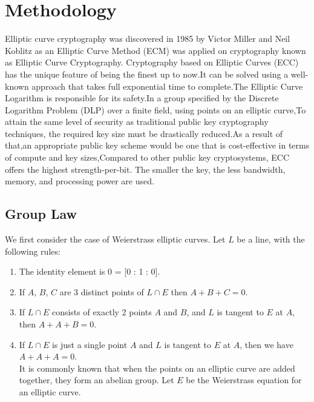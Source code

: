 \newtheorem{defn}{Definition}[section]
\newtheorem{exmp}{Example}[section]
\chapter{Methodology}
Elliptic curve cryptography was discovered in 1985 by Victor Miller and Neil Koblitz as an Elliptic Curve Method (ECM) was applied on cryptography known as Elliptic Curve Cryptography.
Cryptography based on Elliptic Curves (ECC) has the unique feature of being the finest up to now.It can be solved using a well-known approach that takes full exponential time to complete.The Elliptic Curve Logarithm is responsible for its safety.In a group specified by the Discrete Logarithm Problem (DLP) over a finite field, using points on an elliptic curve,To attain the same level of security as traditional public key cryptography techniques, the required key size must be drastically reduced.As a result of that,an appropriate public key scheme would be one that is cost-effective in terms of compute and key sizes,Compared to other public key cryptosystems, ECC offers the highest strength-per-bit. The smaller the key, the less bandwidth, memory, and processing power are used.\\
\section{Group Law}
We first consider the case of Weierstrass
elliptic curves. Let $L$ be a line, with the following rules:
\begin{enumerate}
	\item 	The identity element is 0 = [0 : 1 : 0].
	\item	If $A$, $B$, $C$ are 3 distinct points of  $ L \cap E$  then $A+B+C=0$.
	\item	If $ L \cap E$ consists of exactly 2 points $A$ and $B$, and $L$ is tangent to $E$ at $A$, then $A + A + B = 0$.
	\item	If $ L \cap E$ is just a single point $A$ and $L$ is tangent to $E$ at $A$, then we
	have $A + A + A = 0$.\\
It is commonly known that when the points on an elliptic curve are added together, they form an abelian group. Let $E$ be the Weierstrass equation for an elliptic curve.	
\end{enumerate}
